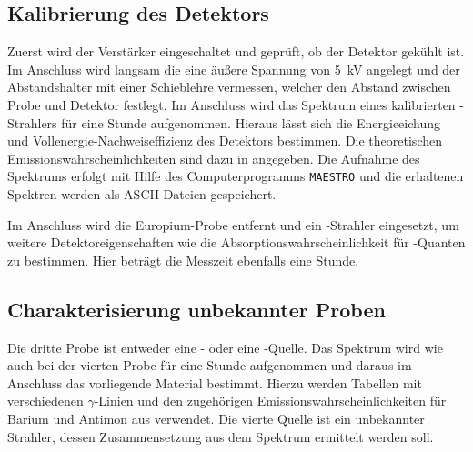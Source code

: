 \subsection{Kalibrierung des Detektors}
\label{sec:KalibrierungBeschreibung}

Zuerst wird der Verstärker eingeschaltet und geprüft, ob der Detektor gekühlt ist.
Im Anschluss wird langsam die eine äußere Spannung von \SI{5}{\kilo\volt} angelegt
und der Abstandshalter mit einer Schieblehre vermessen,
welcher den Abstand zwischen Probe und Detektor festlegt.
Im Anschluss wird das Spektrum eines kalibrierten -Strahlers für eine Stunde aufgenommen.
Hieraus lässt sich die Energieeichung und Vollenergie-Nachweiseffizienz
des Detektors bestimmen.
Die theoretischen Emissionswahrscheinlichkeiten sind dazu in \cite[28]{anleitung} angegeben.
Die Aufnahme des Spektrums erfolgt mit Hilfe des Computerprogramms
\texttt{MAESTRO} und die erhaltenen Spektren werden als ASCII-Dateien gespeichert.

Im Anschluss wird die Europium-Probe entfernt und ein -Strahler eingesetzt,
um weitere Detektoreigenschaften wie die Absorptionswahrscheinlichkeit für
-Quanten zu bestimmen.
Hier beträgt die Messzeit ebenfalls eine Stunde.

\subsection{Charakterisierung unbekannter Proben}
\label{sec:CharakterisierungBeschreibung}

Die dritte Probe ist entweder eine - oder eine -Quelle.
Das Spektrum wird wie auch bei der vierten Probe für eine Stunde aufgenommen
und daraus im Anschluss das vorliegende Material bestimmt.
Hierzu werden Tabellen mit verschiedenen $\gamma$-Linien und den zugehörigen
Emissionswahrscheinlichkeiten für Barium und Antimon aus \cite[28]{anleitung}
verwendet.
Die vierte Quelle ist ein unbekannter Strahler, dessen Zusammensetzung
aus dem Spektrum ermittelt werden soll.
